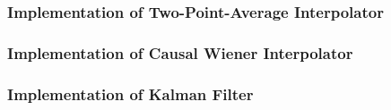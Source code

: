 \documentclass[11pt]{article}
\begin{document}

\subsubsection*{Implementation of Two-Point-Average Interpolator}



\subsubsection*{Implementation of Causal Wiener Interpolator}



\subsubsection*{Implementation of Kalman Filter}
\end{document}
